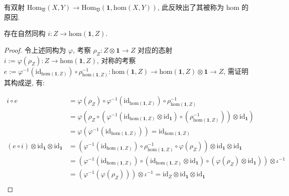 \begin{lemma}
    有双射 \(\mathrm{Hom}_{\mathfrak{V}} (X,Y) \to \mathrm{Hom}_{\mathfrak{V}} (\mathbf{1}, \mathrm{hom} (X,Y))\), 此反映出了其被称为 \(\mathrm{hom}\) 的原因.
\end{lemma}

\begin{lemma}
    存在自然同构 \(i : Z \to \mathrm{hom}(\mathbf{1},Z)\).

    \begin{proof}
        令上述同构为 \(\varphi\), 考察 \(\rho_Z : Z \otimes \mathbf{1} \to Z\) 对应的态射 \(i := \varphi(\rho_Z) : Z \to \mathrm{hom} (\mathbf{1},Z)\),
        对称的考察 \(e := \varphi^{-1} (\mathrm{id}_{\mathrm{hom} (\mathbf{1},Z)}) \circ \rho_{\mathrm{hom} (\mathbf{1},Z)}^{-1} : \mathrm{hom} (\mathbf{1},Z) \to \mathrm{hom} (\mathbf{1},Z) \otimes \mathbf{1} \to Z\), 需证明其构成逆, 有:

        \[
            \begin{aligned}
                i \circ e
                &= \varphi(\rho_Z) \circ \varphi^{-1} (\mathrm{id}_{\mathrm{hom} (\mathbf{1},Z)}) \circ \rho_{\mathrm{hom} (\mathbf{1},Z)}^{-1} \\
                &= \varphi (\rho_Z \circ (\varphi^{-1} (\mathrm{id}_{\mathrm{hom} (\mathbf{1},Z)} \otimes \mathrm{id}_{\mathbf{1}}) \circ (\rho_{\mathrm{hom} (\mathbf{1},Z)}^{-1})) \otimes \mathrm{id}_{\mathbf{1}}) \\
                &= \varphi (\varphi^{-1} (\mathrm{id}_{\mathrm{hom} (\mathbf{1},Z)})) = \mathrm{id}_{\mathrm{hom} (\mathbf{1},Z)} \\
                (e \circ i) \otimes \mathrm{id}_{\mathbf{1}} \otimes \mathrm{id}_{\mathbf{1}}
                &= (\varphi^{-1} (\mathrm{id}_{\mathrm{hom} (\mathbf{1},Z)}) \circ \rho_{\mathrm{hom} (\mathbf{1},Z)}^{-1} \circ \varphi(\rho_Z)) \otimes \mathrm{id}_{\mathbf{1}} \otimes \mathrm{id}_{\mathbf{1}} \\
                &= (\varphi^{-1} (\mathrm{id}_{\mathrm{hom} (\mathbf{1},Z)}) \circ (\mathrm{id}_{\mathrm{hom} (\mathbf{1},Z)} \otimes \mathrm{id}_{\mathbf{1}}) \circ (\varphi(\rho_Z) \otimes \mathrm{id}_{\mathbf{1}})) \otimes \iota^{-1} \\
                &= (\varphi^{-1} (\varphi (\rho_Z))) \otimes \iota^{-1} = \mathrm{id}_Z \otimes \mathrm{id}_{\mathbf{1}} \otimes \mathrm{id}_{\mathbf{1}} \\
            \end{aligned}
        \]
    \end{proof}
\end{lemma}

